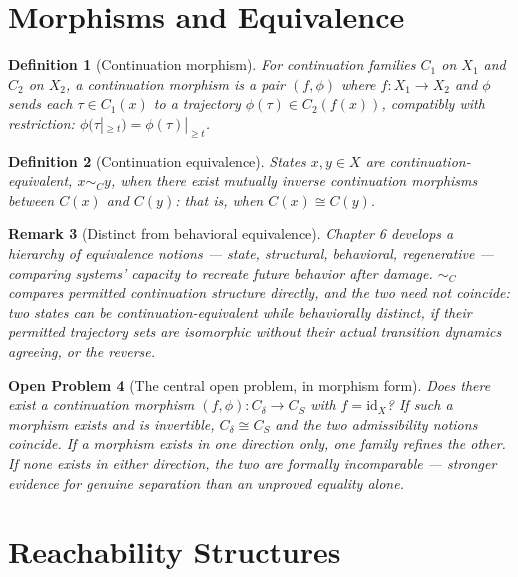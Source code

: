 \documentclass[12pt]{report}
\newtheorem{definition}{Definition}[section]
\newtheorem{openproblem}[definition]{Open Problem}
\newtheorem{remark}[definition]{Remark}
\begin{document}
\section*{Morphisms and Equivalence}

\begin{definition}[Continuation morphism]
\label{def:continuation-morphism}
For continuation families $C_1$ on $X_1$ and $C_2$ on $X_2$, a
continuation morphism is a pair $(f,\phi)$ where $f : X_1 \to X_2$ and
$\phi$ sends each $\tau \in C_1(x)$ to a trajectory $\phi(\tau) \in
C_2(f(x))$, compatibly with restriction: $\phi(\tau|_{\geq t}) =
\phi(\tau)|_{\geq t}$.
\end{definition}

\begin{definition}[Continuation equivalence]
States $x, y \in X$ are continuation-equivalent, $x \sim_C y$, when
there exist mutually inverse continuation morphisms between $C(x)$ and
$C(y)$: that is, when $C(x) \cong C(y)$.
\end{definition}

\begin{remark}[Distinct from behavioral equivalence]
Chapter 6 develops a hierarchy of equivalence notions --- state,
structural, behavioral, regenerative --- comparing systems' capacity to
recreate future behavior after damage. $\sim_C$ compares permitted
continuation structure directly, and the two need not coincide: two
states can be continuation-equivalent while behaviorally distinct, if
their permitted trajectory sets are isomorphic without their actual
transition dynamics agreeing, or the reverse.
\end{remark}

\begin{openproblem}[The central open problem, in morphism form]
\label{prob:admissibility-morphism}
Does there exist a continuation morphism $(f,\phi) : C_\delta \to C_S$
with $f = \mathrm{id}_X$? If such a morphism exists and is invertible,
$C_\delta \cong C_S$ and the two admissibility notions coincide. If a
morphism exists in one direction only, one family refines the other. If
none exists in either direction, the two are formally incomparable ---
stronger evidence for genuine separation than an unproved equality
alone.
\end{openproblem}

\section*{Reachability Structures}
\end{document}
